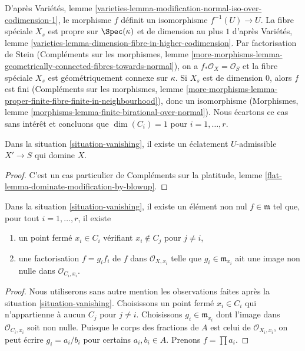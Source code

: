 \noindent D'après Variétés, lemme \ref{varieties-lemma-modification-normal-iso-over-codimension-1}, le morphisme $f$ définit un isomorphisme $f^{-1}(U) \to U$. La fibre spéciale $X_s$ est propre sur $\Spec(\kappa)$ et de dimension au plus $1$ d'après Variétés, lemme \ref{varieties-lemma-dimension-fibre-in-higher-codimension}. Par factorisation de Stein (Compléments sur les morphismes, lemme \ref{more-morphisms-lemma-geometrically-connected-fibres-towards-normal}), on a $f_*\mathcal{O}_X = \mathcal{O}_S$ et la fibre spéciale $X_s$ est géométriquement connexe sur $\kappa$. Si $X_s$ est de dimension $0$, alors $f$ est fini (Compléments sur les morphismes, lemme \ref{more-morphisms-lemma-proper-finite-fibre-finite-in-neighbourhood}), donc un isomorphisme (Morphismes, lemme \ref{morphisms-lemma-finite-birational-over-normal}). Nous écartons ce cas sans intérêt et concluons que $\dim(C_i) = 1$ pour $i = 1, \ldots, r$.

\begin{lemma} \label{lemma-dominate-by-scheme-modification} Dans la situation \ref{situation-vanishing}, il existe un éclatement $U$-admissible $X' \to S$ qui domine $X$. \end{lemma}

\begin{proof} C'est un cas particulier de Compléments sur la platitude, lemme \ref{flat-lemma-dominate-modification-by-blowup}. \end{proof}

\begin{lemma} \label{lemma-nice-meromorphic-function} Dans la situation \ref{situation-vanishing}, il existe un élément non nul $f \in \mathfrak m$ tel que, pour tout $i = 1, \ldots, r$, il existe \begin{enumerate} \item un point fermé $x_i \in C_i$ vérifiant $x_i \not \in C_j$ pour $j \not = i$, \item une factorisation $f = g_i f_i$ de $f$ dans $\mathcal{O}_{X, x_i}$ telle que $g_i \in \mathfrak m_{x_i}$ ait une image non nulle dans $\mathcal{O}_{C_i, x_i}$. \end{enumerate} \end{lemma}

\begin{proof} Nous utiliserons sans autre mention les observations faites après la situation \ref{situation-vanishing}. Choisissons un point fermé $x_i \in C_i$ qui n'appartienne à aucun $C_j$ pour $j \not = i$. Choisissons $g_i \in \mathfrak m_{x_i}$ dont l'image dans $\mathcal{O}_{C_i, x_i}$ soit non nulle. Puisque le corps des fractions de $A$ est celui de $\mathcal{O}_{X_i, x_i}$, on peut écrire $g_i = a_i/b_i$ pour certains $a_i, b_i \in A$. Prenons $f = \prod a_i$. \end{proof}

